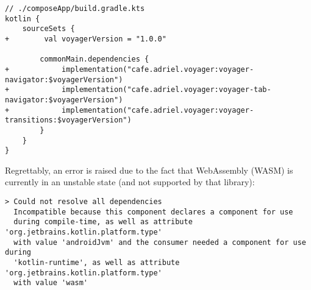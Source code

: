 \begin{lstlisting}
// ./composeApp/build.gradle.kts
kotlin {
    sourceSets {
+        val voyagerVersion = "1.0.0"

        commonMain.dependencies {
+            implementation("cafe.adriel.voyager:voyager-navigator:$voyagerVersion")
+            implementation("cafe.adriel.voyager:voyager-tab-navigator:$voyagerVersion")
+            implementation("cafe.adriel.voyager:voyager-transitions:$voyagerVersion")
        }
    }
}
\end{lstlisting}

\noindent Regrettably, an error is raised due to the fact that WebAssembly (WASM) is currently in an unstable state
(and not supported by that library):


\begin{lstlisting}
> Could not resolve all dependencies
  Incompatible because this component declares a component for use 
  during compile-time, as well as attribute 'org.jetbrains.kotlin.platform.type' 
  with value 'androidJvm' and the consumer needed a component for use during 
  'kotlin-runtime', as well as attribute 'org.jetbrains.kotlin.platform.type' 
  with value 'wasm'
\end{lstlisting}
